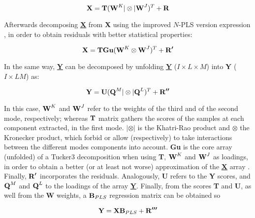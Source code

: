 \begin{equation}
\textbf{\text{X}}=\textbf{\text{T}}(\textbf{\text{W}}^{K}|\otimes{}|\textbf{\text{W}}^{J})^{T}+\textbf{\text{R}}
\label{equation01}
\end{equation}

Afterwards decomposing \textbf{\underline{X}} from \textbf{X} using the improved $N$-PLS version expression \parencite{bro2001difference}, in order to obtain residuals with better statistical properties:

\begin{equation}
\textbf{\text{X}}=\textbf{\text{T}}\textbf{\text{Gu}}(\textbf{\text{W}}^{K}\otimes{}\textbf{\text{W}}^{J})^{T}+\textbf{\text{R}}^{\boldsymbol{\prime{}}}
\label{equation02}
\end{equation}

In the same way, \textbf{\underline{Y}} can be decomposed by unfolding \textbf{\underline{Y}} ($I \times L \times M$) into \textbf{Y} ($I \times LM$) as:

\begin{equation}
\textbf{\text{Y}}=\textbf{\text{U}}(\textbf{\text{Q}}^{M}|\otimes{}|\textbf{\text{Q}}^{L})^{T}+\textbf{\text{R}}^{\boldsymbol{\prime{}\prime{}}}
\label{equation03}
\end{equation}

In this case, $\textbf{\text{W}}^{K}$ and $\textbf{\text{W}}^{J}$ refer to the weights of the third and of the second mode, respectively; whereas $\textbf{\text{T}}$ matrix gathers the scores of the samples at each component extracted, in the first mode. $|\otimes{}|$ is the Khatri-Rao product and $\otimes{}$ the Kronecker product, which forbid or allow (respectively) to take interactions between the different modes components into account. 
\textbf{Gu} is the core array (unfolded) of a Tucker3 decomposition when using \textbf{T}, $\textbf{\text{W}}^{K}$ and $\textbf{\text{W}}^{J}$ as loadings, in order to obtain a better (or at least not worse) approximation of the \textbf{\underline{X}} array \parencite{smilde2005multi}. Finally, $\textbf{\text{R}}^{\boldsymbol{\prime{}}}$ incorporates the residuals. Analogously, \textbf{U} refers to the \textbf{Y} scores, and $\textbf{\text{Q}}^{M}$ and $\textbf{\text{Q}}^{L}$ to the loadings of the array \textbf{\underline{Y}}.
Finally, from the scores \textbf{T} and \textbf{U}, as well from the \textbf{W} weights, a $\textbf{\text{B}}_{PLS}$ regression matrix can be obtained \parencite{bro1998multi} so

\begin{equation}
\textbf{\text{Y}}=\textbf{\text{X}}\textbf{\text{B}}_{PLS}+\textbf{\text{R}}^{\boldsymbol{\prime{}\prime{}\prime{}}}
\label{equation04}
\end{equation}

